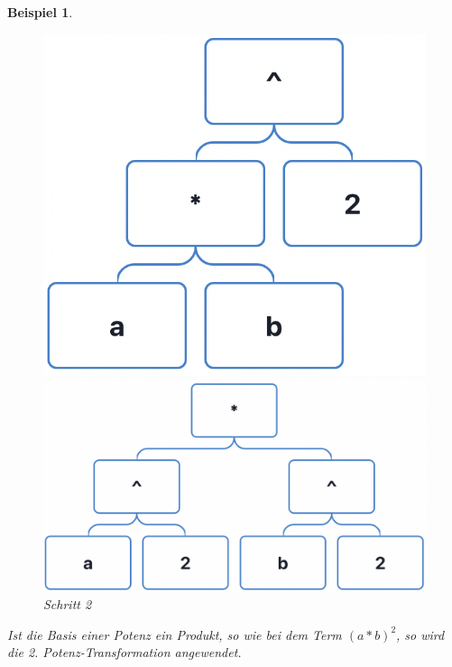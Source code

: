 \documentclass[11pt]{article}
\newtheorem{example}{Beispiel}
\begin{document}
\begin{example}
  \begin{figure}[h]
    \begin{minipage}{.5\textwidth}
      \centering
      \includegraphics[scale=0.4]{trees/power/beispiel_3_1.png}
      \caption{Schritt 1}
    \end{minipage}
    \begin{minipage}{.5\textwidth}
      \centering
      \includegraphics[scale=0.4]{trees/power/beispiel_3_2.png}
      \caption{Schritt 2}
    \end{minipage}
  \end{figure}
  Ist die Basis einer Potenz ein Produkt, so wie bei dem Term ${{(a*b)}^2}$, so wird die 2.
  Potenz-Transformation angewendet.
\end{example}
\end{document}
